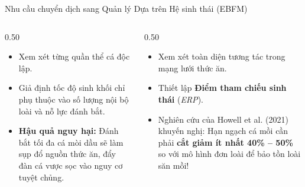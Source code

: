 \documentclass[aspectratio=169, 10pt]{beamer}
\begin{document}
\begin{frame}{Nhu cầu chuyển dịch sang Quản lý Dựa trên Hệ sinh thái (EBFM)}
  \begin{columns}[c]
    \begin{column}{0.50\textwidth}
      \begin{tcolorbox}[colback=red!5!white, colframe=CoralAlert, arc=2mm, title=\textbf{Quản lý đơn loài truyền thống}]
        \footnotesize
        \begin{itemize}
          \item Xem xét từng quần thể cá độc lập.
          \item Giả định tốc độ sinh khối chỉ phụ thuộc vào số lượng nội bộ loài và nỗ lực đánh bắt.
          \item \textbf{Hậu quả nguy hại:} Đánh bắt tối đa cá mòi dầu sẽ làm sụp đổ nguồn thức ăn, đẩy đàn cá vược sọc vào nguy cơ tuyệt chủng.
        \end{itemize}
      \end{tcolorbox}
    \end{column}

    \begin{column}{0.50\textwidth}
      \begin{tcolorbox}[colback=OceanLight, colframe=OceanNavy, arc=2mm, title=\textbf{Quản lý dựa trên hệ sinh thái (EBFM)}]
        \footnotesize
        \begin{itemize}
          \item Xem xét toàn diện tương tác trong mạng lưới thức ăn.
          \item Thiết lập \textbf{Điểm tham chiếu sinh thái} (\textit{ERP}).
          \item Nghiên cứu của Howell et al. (2021) khuyến nghị: Hạn ngạch cá mồi cần phải \textbf{cắt giảm ít nhất 40\% -- 50\%} so với mô hình đơn loài để bảo tồn loài săn mồi!
        \end{itemize}
      \end{tcolorbox}
    \end{column}
  \end{columns}

  
\end{frame}



\end{document}
